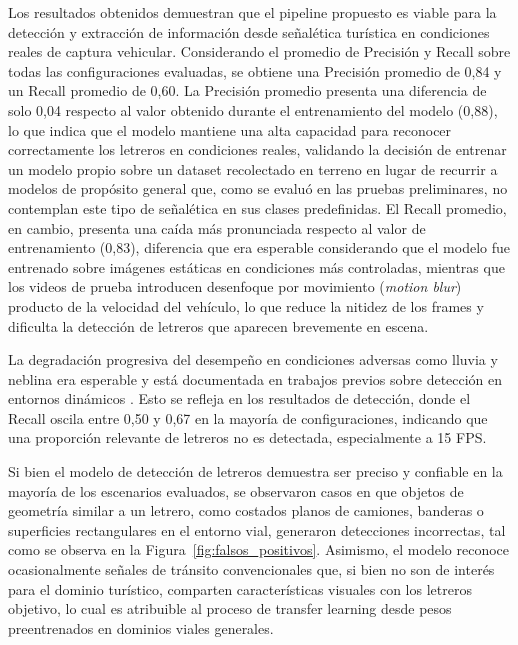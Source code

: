 \documentclass[runningheads]{llncs}
\begin{document}
Los resultados obtenidos demuestran que el pipeline propuesto es viable para la
 detección y extracción de información desde señalética turística en condiciones reales de captura vehicular. Considerando el promedio de Precisión y Recall 
sobre todas las configuraciones evaluadas, se obtiene una Precisión promedio de 0,84 y un Recall promedio de 0,60. 
La Precisión promedio presenta una diferencia de solo 0,04 respecto al valor obtenido durante el entrenamiento del 
modelo (0,88), lo que indica que el modelo mantiene una alta capacidad para reconocer correctamente los letreros 
en condiciones reales, validando la decisión de entrenar un modelo propio sobre un dataset recolectado en terreno 
en lugar de recurrir a modelos de propósito general que, como se evaluó en las pruebas preliminares, no contemplan 
este tipo de señalética en sus clases predefinidas. El Recall promedio, en cambio, presenta una caída más pronunciada 
respecto al valor de entrenamiento (0,83), diferencia que era esperable considerando que el modelo fue entrenado 
sobre imágenes estáticas en condiciones más controladas, mientras que los videos de prueba introducen desenfoque 
por movimiento (\textit{motion blur}) producto de la velocidad del vehículo, lo que reduce la nitidez de los frames 
y dificulta la detección de letreros que aparecen brevemente en escena.

La degradación progresiva del desempeño en condiciones adversas como 
lluvia y neblina era esperable y está documentada en trabajos previos 
sobre detección en entornos dinámicos \cite{yolo-escenarios-naturales}.
 Esto se refleja en los resultados de detección, donde el Recall oscila entre 0,50 y 0,67 en la mayoría de configuraciones,
indicando que una proporción relevante de letreros no es detectada, 
especialmente a 15 FPS.

Si bien el modelo de detección de letreros demuestra ser preciso y confiable en la 
mayoría de los escenarios evaluados, se observaron casos en que objetos 
de geometría similar a un letrero, como costados planos de camiones, 
banderas o superficies rectangulares en el entorno vial, generaron 
detecciones incorrectas, tal como se observa en la 
Figura~\ref{fig:falsos_positivos}. Asimismo, el modelo reconoce 
ocasionalmente señales de tránsito convencionales que, si bien no 
son de interés para el dominio turístico, comparten características 
visuales con los letreros objetivo, lo cual es atribuible al proceso de 
transfer learning desde pesos preentrenados en dominios viales generales.
\end{document}
